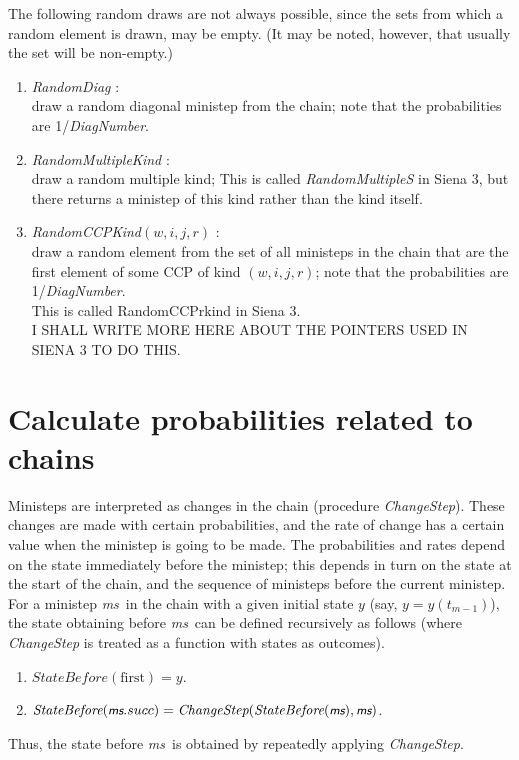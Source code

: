 \documentclass[a4paper,fleqn,12pt]{article}
\newcommand{\ms}{\textsl{\textsf{\small ms}}} %
\begin{document}
The following random draws are not always possible, since the sets
from which a random element is drawn, may be empty.
(It may be noted, however, that usually the set will be non-empty.)
\begin{enumerate}[resume]
\item \emph{RandomDiag}      :\\
      draw a random diagonal ministep from the chain;
      note that the probabilities are 1/\textit{DiagNumber}.
\item \emph{RandomMultipleKind}      :\\
      draw a random multiple kind;
      This is called \textit{RandomMultipleS} in Siena 3,
      but there returns a ministep of this kind rather than
      the kind itself.
\item \emph{RandomCCPKind}$(w,i,j,r)$    :\\
      draw a random element from the set of all ministeps in the chain
      that are the first element of some CCP of kind $(w,i,j,r)$;
      note that the probabilities are 1/\textit{DiagNumber}.\\
      This is called RandomCCPrkind in Siena 3.\\
      I SHALL WRITE MORE HERE ABOUT THE POINTERS USED IN SIENA 3
      TO DO THIS.
\end{enumerate}

\section{Calculate probabilities related to chains}
\label{S_prob}

Ministeps are interpreted as changes in the chain (procedure \textit{ChangeStep}).
These changes are made with certain probabilities, and the
rate of change has a certain value when the ministep is going to be made.
The probabilities and rates depend on the state immediately before the ministep;
this depends in turn on the state at the start of the chain, and the
sequence of ministeps before the current ministep.
For a ministep \ms \ in the chain with a given initial state $y$
(say, $y = y(t_{m-1})$), the state obtaining before \ms \
can be defined recursively as follows (where \textit{ChangeStep} is treated
as a function with states as outcomes).
\begin{enumerate}
\item $\textit{StateBefore}(\text{first}) = y$.
\item $\textit{StateBefore}(\ms.succ) = \textit{ChangeStep}(\textit{StateBefore}(\ms),\ms)$.
\end{enumerate}
Thus, the state before \ms \ is obtained by repeatedly applying \textit{ChangeStep}.
\end{document}
